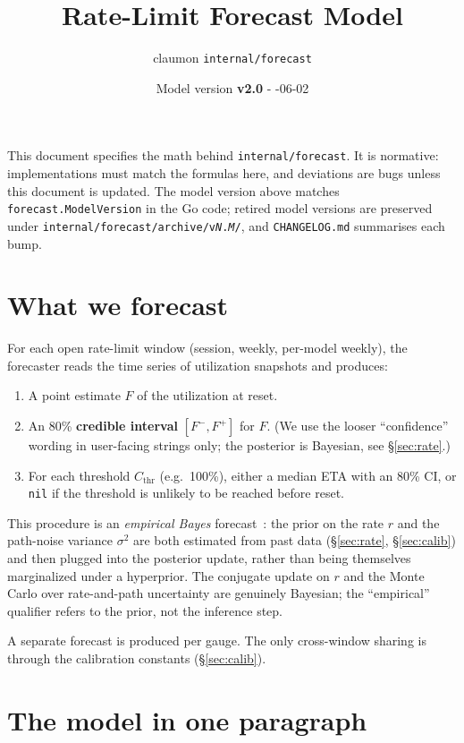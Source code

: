 \documentclass[11pt]{article}
\title{Rate-Limit Forecast Model}
\author{claumon \texttt{internal/forecast}}
\date{Model version \textbf{v2.0} \enspace - \enspace 2026-06-02}
\newcommand{\Cthr}{C_{\text{thr}}}
\begin{document}
\maketitle

This document specifies the math behind \texttt{internal/forecast}. It is
normative: implementations must match the formulas here, and deviations are
bugs unless this document is updated. The model version above matches
\texttt{forecast.ModelVersion} in the Go code; retired model versions are
preserved under \texttt{internal/forecast/archive/v\textit{N}.\textit{M}/},
and \texttt{CHANGELOG.md} summarises each bump.

\section{What we forecast}

For each open rate-limit window (session, weekly, per-model weekly), the
forecaster reads the time series of utilization snapshots and produces:

\begin{enumerate}
  \item A point estimate $F$ of the utilization at reset.
  \item An 80\% \textbf{credible interval} $[F^-, F^+]$ for $F$. (We use the
    looser ``confidence'' wording in user-facing strings only; the posterior
    is Bayesian, see \S\ref{sec:rate}.)
  \item For each threshold $\Cthr$ (e.g.\ 100\%), either a median ETA with an
    80\% CI, or \texttt{nil} if the threshold is unlikely to be reached
    before reset.
\end{enumerate}

This procedure is an \emph{empirical Bayes} forecast~\cite{casella1985}: the prior on the rate
$r$ and the path-noise variance $\sigma^2$ are both estimated from past data
(\S\ref{sec:rate}, \S\ref{sec:calib}) and then plugged into the posterior
update, rather than being themselves marginalized under a hyperprior. The
conjugate update on $r$ and the Monte Carlo over rate-and-path uncertainty
are genuinely Bayesian; the ``empirical'' qualifier refers to the prior, not
the inference step.

A separate forecast is produced per gauge. The only cross-window sharing is
through the calibration constants (\S\ref{sec:calib}).

\section{The model in one paragraph}
\end{document}
